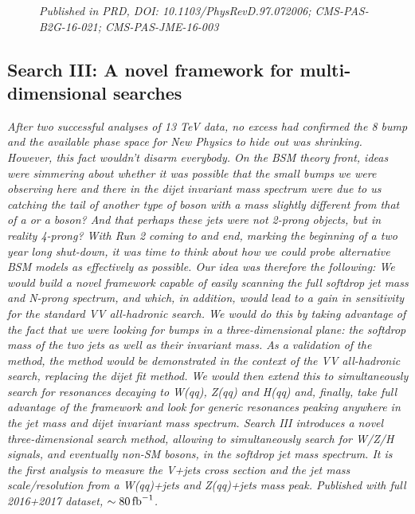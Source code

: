 \begin{singlespace}
\begin{figure}[b!]
    \vspace*{10mm}
    \caption*{\footnotesize{\textit{Published in PRD, DOI: 10.1103/PhysRevD.97.072006; CMS-PAS-B2G-16-021; CMS-PAS-JME-16-003}}}
\end{figure}
\vspace*{\fill}
\end{singlespace}

\clearpage

\clearpage

\begin{singlespace}
\vspace*{\fill}
\begin{centering}
\section{Search III: A novel framework for multi-dimensional searches}
\label{searchIII}
\textit{
After two successful analyses of 13 TeV data, no excess had confirmed the 8 \TeV bump and the available phase space for New Physics to hide out was shrinking. However, this fact wouldn't disarm everybody. On the BSM theory front, ideas were simmering about whether it was possible that the small bumps we were observing here and there in the dijet invariant mass spectrum were due to us catching the tail of another type of boson with a mass slightly different from that of a \PW or a \PZ boson? And that perhaps these jets were not 2-prong objects, but in reality 4-prong? With Run 2 coming to and end, marking the beginning of a two year long shut-down, it was time to think about how we could probe alternative BSM models as effectively as possible. Our idea was therefore the following: We would build a novel framework capable of easily scanning the full softdrop jet mass and N-prong spectrum, and which, in addition, would lead to a gain in sensitivity for the standard VV all-hadronic search. We would do this by taking advantage of the fact that we were looking for bumps in a three-dimensional plane: the softdrop mass of the two jets as well as their invariant mass. As a validation of the method, the method would be demonstrated in the context of the VV all-hadronic search, replacing the dijet fit method. We would then extend this to simultaneously search for resonances decaying to W(qq), Z(qq) and H(qq) and, finally, take full advantage of the framework and look for generic resonances peaking anywhere in the jet mass and dijet invariant mass spectrum.
\newline
\newline
Search III introduces a novel three-dimensional search method, allowing to simultaneously search for W/Z/H signals, and eventually non-SM bosons, in the softdrop jet mass spectrum. It is the first analysis to measure the V+jets cross section and the jet mass scale/resolution from a W(qq)+jets and Z(qq)+jets mass peak. Published with full 2016+2017 dataset, $\sim 80 \mbox{\ensuremath{\,\text{fb}^\text{$-$1}}}$.}

\end{centering}
\end{singlespace}
